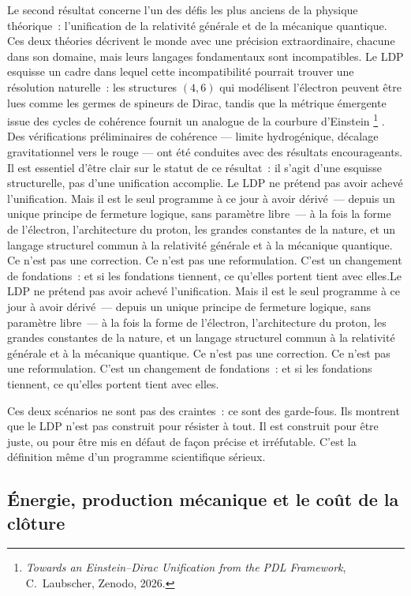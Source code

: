\documentclass[12pt, a4paper, openright]{book}
\begin{document}
Le second résultat concerne l'un des défis les plus anciens de la physique théorique~: l'unification de la relativité générale et de la mécanique quantique. Ces deux théories décrivent le monde avec une précision extraordinaire, chacune dans son domaine, mais leurs langages fondamentaux sont incompatibles. Le LDP esquisse un cadre dans lequel cette incompatibilité pourrait trouver une résolution naturelle~: les structures $(4,6)$ qui modélisent l'électron peuvent être lues comme les germes de spineurs de Dirac, tandis que la métrique émergente issue des cycles de cohérence fournit un analogue de la courbure d'Einstein
\footnote{\textit{Towards an Einstein--Dirac Unification from the PDL Framework}, C.~Laubscher, Zenodo, 2026.}
. Des vérifications préliminaires de cohérence --- limite hydrogénique, décalage gravitationnel vers le rouge --- ont été conduites avec des résultats encourageants. Il est essentiel d'être clair sur le statut de ce résultat~: il s'agit d'une esquisse structurelle, pas d'une unification accomplie. Le LDP ne prétend pas avoir achevé l'unification. Mais il est le seul programme à ce jour à avoir dérivé~--- depuis un unique principe de fermeture logique, sans paramètre libre~--- à la fois la forme de l'électron, l'architecture du proton, les grandes constantes de la nature, et un langage structurel commun à la relativité générale et à la mécanique quantique. Ce n'est pas une correction. Ce n'est pas une reformulation. C'est un changement de fondations~: et si les fondations tiennent, ce qu'elles portent tient avec elles.Le LDP ne prétend pas avoir achevé l'unification. Mais il est le seul programme à ce jour à avoir dérivé~--- depuis un unique principe de fermeture logique, sans paramètre libre~--- à la fois la forme de l'électron, l'architecture du proton, les grandes constantes de la nature, et un langage structurel commun à la relativité générale et à la mécanique quantique. Ce n'est pas une correction. Ce n'est pas une reformulation. C'est un changement de fondations~: et si les fondations tiennent, ce qu'elles portent tient avec elles.

\medskip

Ces deux scénarios ne sont pas des craintes~: ce sont des garde-fous. Ils montrent que le LDP n'est pas construit pour résister à tout. Il est construit pour être juste, ou pour être mis en défaut de façon précise et irréfutable. C'est la définition même d'un programme scientifique sérieux.

\subsection*{Énergie, production mécanique et le coût de la clôture}
\end{document}
